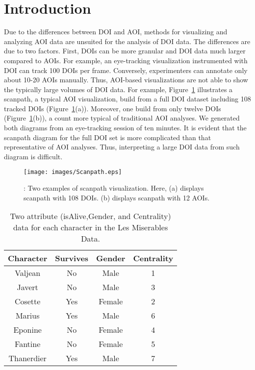 \section{Introduction}
Due to the differences between DOI and AOI, methods for visualizing and analyzing AOI data are unsuited for the analysis of DOI data. The differences are due to two factors. First, DOIs can be more granular and DOI data much larger compared to AOIs. For example, an eye-tracking visualization instrumented with DOI can track 100 DOIs per frame. Conversely, experimenters can annotate only about 10-20 AOIs manually. Thus, AOI-based visualizations are not able to show the typically large volumes of DOI data. For example, Figure~\ref{fig:Scanpath} illustrates a scanpath, a typical AOI visualization,  build from a full DOI dataset including 108 tracked DOIs (Figure~\ref{fig:Scanpath}(a)). Moreover, one build from only twelve DOIs (Figure~\ref{fig:Scanpath}(b)), a count more typical of traditional AOI analyses. We generated both diagrams from an eye-tracking session of ten minutes. It is evident that the scanpath diagram for the full DOI set is more complicated than that representative of AOI analyses. Thus, interpreting a large DOI data from such diagram is difficult. 

\begin{figure}[htb]
  \centering
  \texttt{[image: images/Scanpath.eps]}
  \caption{: Two examples of scanpath visualization. Here, (a) displays scanpath with 108 DOIs. (b) displays scanpath with 12 AOIs. }
	\label{fig:Scanpath}
\end{figure}

\begin{table}[htbp]
	\centering
		\begin{tabular}{|c|c|c|c|}
				\hline
				\textbf{Character}	& \textbf{Survives} &	\textbf{Gender}	& \textbf{Centrality}\\\hline
			
				Valjean	& No	&Male	&1\\\hline
Javert	&No&	Male&	3\\\hline
Cosette 	&Yes	&Female&	2\\\hline
Marius	&Yes	&Male&	6\\\hline
Eponine	&No	&Female&	4\\\hline
Fantine	&No	&Female	&5\\\hline
Thanerdier	&Yes	&Male	&7\\\hline

		\end{tabular}
		\caption{Two attribute (isAlive,Gender, and Centrality) data for each character in the Les Miserables Data. }
		\label{tab:LesMiserablesAttribute}
\end{table}

